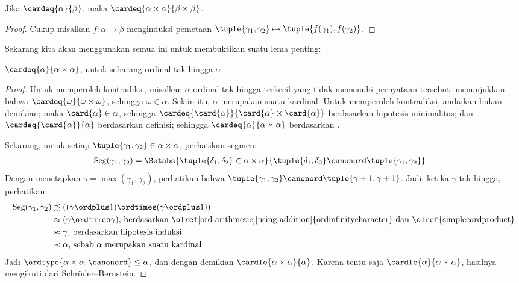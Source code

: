 \documentclass[../../../include/open-logic-section]{subfiles}
\begin{document}
\begin{prop}
Jika $\cardeq{\alpha}{\beta}$, maka
$\cardeq{\alpha \times \alpha}{\beta \times \beta}$.
\end{prop}

\begin{proof}
Cukup misalkan $f \colon \alpha \to \beta$ menginduksi pemetaan
$\tuple{\gamma_1, \gamma_2} \mapsto
\tuple{f(\gamma_1), f(\gamma_2)}$.
\end{proof}
\noindent
Sekarang kita akan menggunakan semua ini untuk membuktikan suatu lema
penting:
\begin{lem}
$\cardeq{\alpha}{\alpha \times \alpha}$, untuk sebarang ordinal tak hingga
$\alpha$
\end{lem}

\begin{proof}
Untuk memperoleh kontradiksi, misalkan $\alpha$ ordinal tak hingga terkecil
yang tidak memenuhi pernyataan tersebut.
 menunjukkan bahwa
$\cardeq{\omega}{\omega\times\omega}$, sehingga $\omega \in \alpha$.
Selain itu, $\alpha$ merupakan suatu kardinal. Untuk memperoleh kontradiksi,
andaikan bukan demikian; maka $\card{\alpha} \in \alpha$, sehingga
$\cardeq{\card{\alpha}}{\card{\alpha} \times \card{\alpha}}$ berdasarkan
hipotesis minimalitas; dan $\cardeq{\card{\alpha}}{\alpha}$ berdasarkan
definisi; sehingga $\cardeq{\alpha}{\alpha\times\alpha}$ berdasarkan
.

Sekarang, untuk setiap
$\tuple{\gamma_1, \gamma_2} \in \alpha \times \alpha$, perhatikan segmen:
\begin{align*}
	\text{Seg}(\gamma_1, \gamma_2) &= \Setabs{\tuple{\delta_1, \delta_2} \in \alpha \times \alpha}{\tuple{\delta_1, \delta_2} \canonord \tuple{\gamma_1, \gamma_2}}
\end{align*}
Dengan menetapkan $\gamma = \max(\gamma_1, \gamma_2)$, perhatikan bahwa
$\tuple{\gamma_1, \gamma_2} \canonord
\tuple{\gamma+1, \gamma + 1}$. Jadi, ketika $\gamma$ tak hingga, perhatikan:
\begin{align*}
	\text{Seg}(\gamma_1, \gamma_2) & 
	\precsim ((\gamma \ordplus 1)\ordtimes (\gamma \ordplus 1))\\
	&\approx (\gamma \ordtimes \gamma)
	\text{, berdasarkan \olref[ord-arithmetic][using-addition]{ordinfinitycharacter} dan 
	\olref{simplecardproduct}}\\
	&\approx \gamma \text{, berdasarkan hipotesis induksi}\\
	& \prec \alpha\text{, sebab $\alpha$ merupakan suatu kardinal}
\end{align*}
Jadi $\ordtype{\alpha\times \alpha, \canonord} \leq \alpha$, dan dengan
demikian $\cardle{\alpha \times \alpha}{\alpha}$. Karena tentu saja
$\cardle{\alpha}{\alpha \times \alpha}$, hasilnya mengikuti dari
Schr\"oder--Bernstein.
\end{proof}
\end{document}
